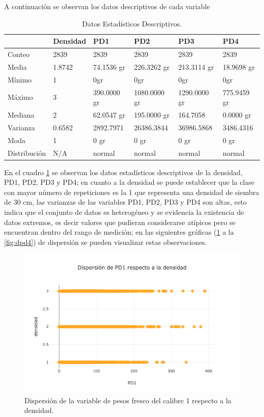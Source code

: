 A continuación se observan los datos descriptivos de cada variable

\begin{table}[htbp]
\begin{center}
\begin{tabular}{|l|l|l|l|l|l|}
\hline
& Densidad & PD1 & PD2 & PD3 & PD4  \\
\hline \hline
Conteo & 2839 & 2839 & 2839 & 2839 & 2839  \\ \hline
Media & 1.8742 & 74.1536 gr & 226.3262 gr & 213.3114 gr & 18.9698 gr  \\ \hline
Mínimo & 1 & 0gr & 0gr & 0gr & 0gr  \\ \hline
Máximo & 3 & 390.0000 gr & 1080.0000 gr & 1290.0000 gr & 775.9459 gr  \\ \hline
Mediana & 2 & 62.0547 gr &195.0000 gr & 164.7058 & 0.0000 gr \\ \hline
Varianza & 0.6582 & 2892.7971 & 26386.3844 & 36986.5868 & 3486.4316 \\ \hline
Moda & 1 & 0 gr & 0 gr &  0 gr & 0 gr  \\ \hline
Distribución & N/A & normal & normal & normal & normal  \\ \hline
\end{tabular}
\caption{Datos Estadísticos Descriptivos.}
\label{tabla:descriptivos}
\end{center}
\end{table}
En el cuadro \ref{tabla:descriptivos} se observan los datos estadísticos descriptivos de la densidad, PD1, PD2, PD3 y PD4; en cuanto a la densidad se puede establecer que la clase con mayor número de repeticiones es la 1 que representa una densidad de siembra de 30 cm, las varianzas de las variables PD1, PD2, PD3 y PD4 son altas, esto indica que el conjunto de datos es heterogéneo y se evidencia la existencia de datos extremos, es decir valores que pudieran considerarse atípicos pero se encuentran dentro del rango de medición;  en las siguientes gráficas (\ref{fig:dpd1} a la \ref{fig:dpd4}) de dispersión se pueden visualizar estas observaciones.\\
\clearpage

\begin{figure}[h!]
	\centering
	\includegraphics[scale=0.5]{d-pd1.png}
	\caption{Dispersión de la variable de pesos fresco del calibre 1 respecto a la densidad.}
	\label{fig:dpd1}
\end{figure}

